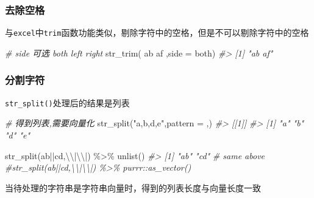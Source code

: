 \documentclass[
]{book}
\newenvironment{Shaded}{\begin{snugshade}}{\end{snugshade}}
\newcommand{\AttributeTok}[1]{\textcolor[rgb]{0.77,0.63,0.00}{#1}}
\newcommand{\CommentTok}[1]{\textcolor[rgb]{0.56,0.35,0.01}{\textit{#1}}}
\newcommand{\FunctionTok}[1]{\textcolor[rgb]{0.00,0.00,0.00}{#1}}
\newcommand{\NormalTok}[1]{#1}
\newcommand{\SpecialCharTok}[1]{\textcolor[rgb]{0.00,0.00,0.00}{#1}}
\newcommand{\StringTok}[1]{\textcolor[rgb]{0.31,0.60,0.02}{#1}}
\begin{document}
\hypertarget{ux53bbux9664ux7a7aux683c}{%
\subsubsection{去除空格}\label{ux53bbux9664ux7a7aux683c}}

与\texttt{excel}中\texttt{trim}函数功能类似，剔除字符中的空格，但是不可以剔除字符中的空格

\begin{Shaded}
\begin{Highlighting}[]
\CommentTok{\# side 可选 both  left right}
\FunctionTok{str\_trim}\NormalTok{(}\StringTok{\textquotesingle{} ab af \textquotesingle{}}\NormalTok{,}\AttributeTok{side =} \StringTok{\textquotesingle{}both\textquotesingle{}}\NormalTok{)}
\CommentTok{\#\textgreater{} [1] "ab af"}
\end{Highlighting}
\end{Shaded}

\hypertarget{ux5206ux5272ux5b57ux7b26}{%
\subsubsection{分割字符}\label{ux5206ux5272ux5b57ux7b26}}

\texttt{str\_split()}处理后的结果是列表

\begin{Shaded}
\begin{Highlighting}[]
\CommentTok{\# 得到列表,需要向量化}
\FunctionTok{str\_split}\NormalTok{(}\StringTok{"a,b,d,e"}\NormalTok{,}\AttributeTok{pattern =} \StringTok{\textquotesingle{},\textquotesingle{}}\NormalTok{)}
\CommentTok{\#\textgreater{} [[1]]}
\CommentTok{\#\textgreater{} [1] "a" "b" "d" "e"}

\FunctionTok{str\_split}\NormalTok{(}\StringTok{\textquotesingle{}ab||cd\textquotesingle{}}\NormalTok{,}\StringTok{\textquotesingle{}}\SpecialCharTok{\textbackslash{}\textbackslash{}}\StringTok{|}\SpecialCharTok{\textbackslash{}\textbackslash{}}\StringTok{|\textquotesingle{}}\NormalTok{) }\SpecialCharTok{\%\textgreater{}\%} \FunctionTok{unlist}\NormalTok{()}
\CommentTok{\#\textgreater{} [1] "ab" "cd"}
\CommentTok{\# same above}
\CommentTok{\#str\_split(\textquotesingle{}ab||cd\textquotesingle{},\textquotesingle{}\textbackslash{}\textbackslash{}|\textbackslash{}\textbackslash{}|\textquotesingle{}) \%\textgreater{}\% purrr::as\_vector()}
\end{Highlighting}
\end{Shaded}

当待处理的字符串是字符串向量时，得到的列表长度与向量长度一致
\end{document}
